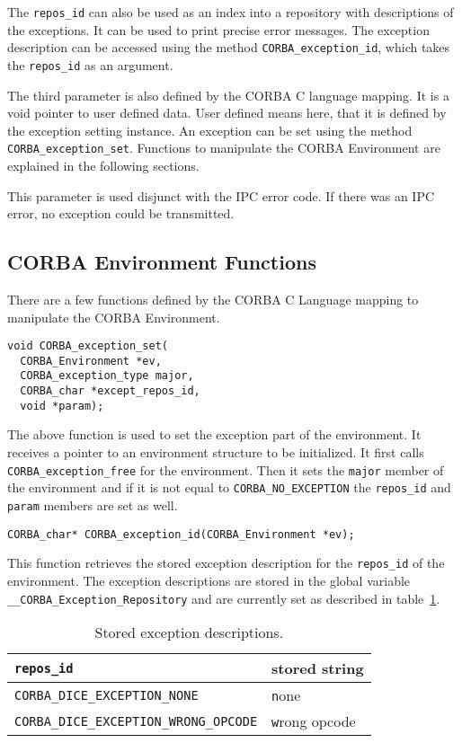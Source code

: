 The \verb|repos_id| can also be used as an index into a
repository with descriptions of the exceptions. It can be
used to print precise error messages. The exception description
can be accessed using the method \verb|CORBA_exception_id|,
which takes the \verb|repos_id| as an argument.

The third parameter is also defined by the CORBA C language
mapping. It is a void pointer to user defined data. User defined
means here, that it is defined by the exception setting instance.
An exception can be set using the method \verb|CORBA_exception_set|.
Functions to manipulate the CORBA Environment are explained
in the following sections.

This parameter is used disjunct with the IPC error code.  If there
was an IPC error, no exception could be transmitted.

\subsection{CORBA Environment Functions}

There are a few functions defined by the CORBA C Language 
mapping \cite{corba-clm} to manipulate the CORBA Environment.

\begin{verbatim}
void CORBA_exception_set(
  CORBA_Environment *ev,
  CORBA_exception_type major,
  CORBA_char *except_repos_id,
  void *param);
\end{verbatim}

The above function is used to set the exception part
of the environment. It receives a pointer to an 
environment structure to be initialized. It first calls
\verb|CORBA_exception_free| for the environment. Then
it sets the \verb|major| member of the environment and
if it is not equal to \verb|CORBA_NO_EXCEPTION| the
\verb|repos_id| and \verb|param| members are set as well.

\begin{verbatim}
CORBA_char* CORBA_exception_id(CORBA_Environment *ev);
\end{verbatim}

This function retrieves the stored exception description
for the \verb|repos_id| of the environment. The exception
descriptions are stored in the global variable
\verb|__CORBA_Exception_Repository| and are currently set
as described in table~\ref{tab:reposid}.

\begin{table}[ht]
\caption{\label{tab:reposid} Stored exception descriptions.}
\begin{tabular}{|l|l|} \hline
\verb|repos_id| & stored string \\ \hline \hline
\verb|CORBA_DICE_EXCEPTION_NONE| & {\texttt none} \\ \hline
\verb|CORBA_DICE_EXCEPTION_WRONG_OPCODE| & {\texttt wrong opcode} \\ \hline
\end{tabular}
\end{table}

